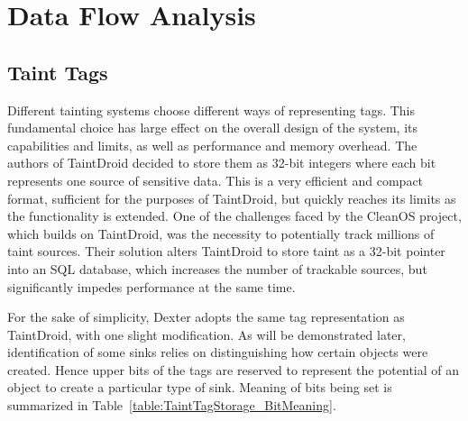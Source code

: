 \documentclass[12pt,twoside,notitlepage]{report}
\begin{document}
\section{Data Flow Analysis}
\label{section:DataFlowAnalysis}

\subsection{Taint Tags}

Different tainting systems choose different ways of representing tags. This fundamental choice has large effect on the overall design of the system, its capabilities and limits, as well as performance and memory overhead. The authors of TaintDroid decided to store them as 32-bit integers where each bit represents one source of sensitive data. This is a very efficient and compact format, sufficient for the purposes of TaintDroid, but quickly reaches its limits as the functionality is extended. One of the challenges faced by the CleanOS project\cite{Tang:2012:CLM:2387880.2387888}, which builds on TaintDroid, was the necessity to potentially track millions of taint sources. Their solution alters TaintDroid to store taint as a 32-bit pointer into an SQL database, which increases the number of trackable sources, but significantly impedes performance at the same time. 

For the sake of simplicity, Dexter adopts the same tag representation as TaintDroid, with one slight modification. As will be demonstrated later, identification of some sinks relies on distinguishing how certain objects were created. Hence upper bits of the tags are reserved to represent the potential of an object to create a particular type of sink. Meaning of bits being set is summarized in Table~\ref{table:TaintTagStorage_BitMeaning}.
\end{document}
